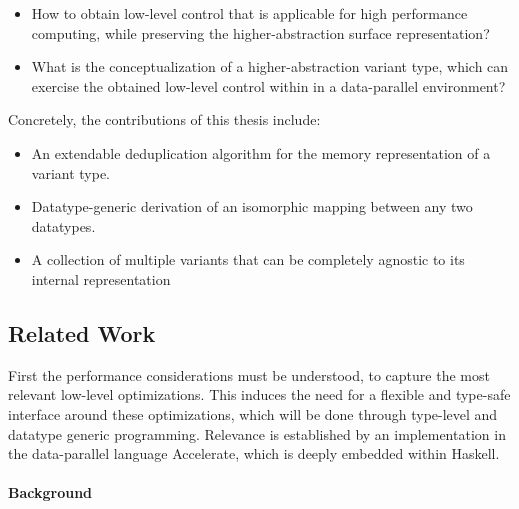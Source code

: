 \documentclass{article}
\begin{document}
\begin{itemize}
    \item How to obtain low-level control that is applicable for high performance computing, while preserving the higher-abstraction surface representation?
    \item What is the conceptualization of a higher-abstraction variant type, which can exercise the obtained low-level control within in a data-parallel environment?
\end{itemize}

\noindent
Concretely, the contributions of this thesis include: 

\begin{itemize}
    \item An extendable deduplication algorithm for the memory representation of a variant type.
    \item Datatype-generic derivation of an isomorphic mapping between any two datatypes.
    \item A collection of multiple variants that can be completely agnostic to its internal representation
\end{itemize}

\subsection{Related Work} \label{related-work}

First the performance considerations must be understood, to capture the most relevant low-level optimizations.
This induces the need for a flexible and type-safe interface around these optimizations, which will be done through type-level and datatype generic programming.
Relevance is established by an implementation in the data-parallel language Accelerate, which is deeply embedded within Haskell.

\paragraph{Background}
\end{document}
